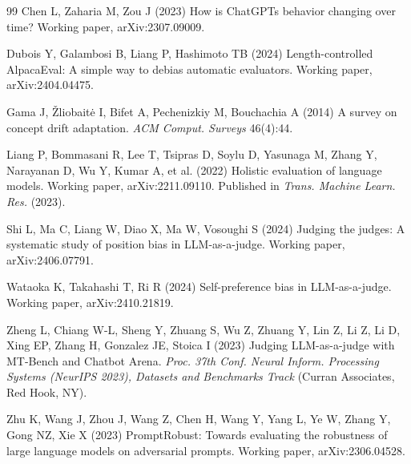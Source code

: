 \documentclass[11pt,a4paper]{article}
\begin{document}
\begin{thebibliography}{99}
 Chen L, Zaharia M, Zou J (2023) How is ChatGPT\textquotesingle s behavior changing over time? Working paper, arXiv:2307.09009.

 Dubois Y, Galambosi B, Liang P, Hashimoto TB (2024) Length-controlled AlpacaEval: A simple way to debias automatic evaluators. Working paper, arXiv:2404.04475.

 Gama J, Žliobaitė I, Bifet A, Pechenizkiy M, Bouchachia A (2014) A survey on concept drift adaptation. \emph{ACM Comput. Surveys} 46(4):44.

 Liang P, Bommasani R, Lee T, Tsipras D, Soylu D, Yasunaga M, Zhang Y, Narayanan D, Wu Y, Kumar A, et al. (2022) Holistic evaluation of language models. Working paper, arXiv:2211.09110. Published in \emph{Trans. Machine Learn. Res.} (2023).

 Shi L, Ma C, Liang W, Diao X, Ma W, Vosoughi S (2024) Judging the judges: A systematic study of position bias in LLM-as-a-judge. Working paper, arXiv:2406.07791.

 Wataoka K, Takahashi T, Ri R (2024) Self-preference bias in LLM-as-a-judge. Working paper, arXiv:2410.21819.

 Zheng L, Chiang W-L, Sheng Y, Zhuang S, Wu Z, Zhuang Y, Lin Z, Li Z, Li D, Xing EP, Zhang H, Gonzalez JE, Stoica I (2023) Judging LLM-as-a-judge with MT-Bench and Chatbot Arena. \emph{Proc. 37th Conf. Neural Inform. Processing Systems (NeurIPS 2023), Datasets and Benchmarks Track} (Curran Associates, Red Hook, NY).

 Zhu K, Wang J, Zhou J, Wang Z, Chen H, Wang Y, Yang L, Ye W, Zhang Y, Gong NZ, Xie X (2023) PromptRobust: Towards evaluating the robustness of large language models on adversarial prompts. Working paper, arXiv:2306.04528.

\end{thebibliography}
\end{document}
